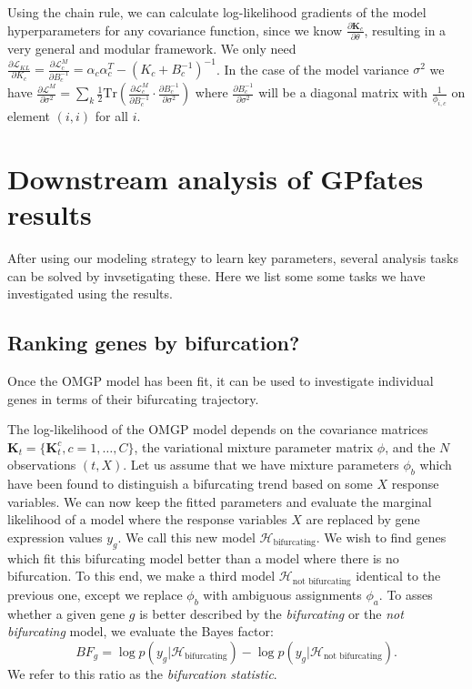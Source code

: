 Using the chain rule, we can calculate log-likelihood gradients of the model hyperparameters for any covariance function, since we know $ \frac{\partial \bm{K}_c}{\partial \mathbb{\theta}} $, resulting in a very general and modular framework. We only need
$ \frac{\partial \mathcal{L}_{KL}}{\partial K_c} =
\frac{\partial \mathcal{L}^{M}_c}{\partial B_c^{-1}} =
\alpha_c \alpha_c^T  - (K_c + B_c^{-1})^{-1} $.
In the case of the model variance $ \sigma^2 $ we have
$ \frac{\partial \mathcal{L}^{M}}{\partial \sigma^2} =
\sum_k \frac{1}{2} \text{Tr} \left( \frac{\partial \mathcal{L}^{M}_c}{\partial B_c^{-1}} \cdot
\frac{\partial B_c^{-1}}{\partial \sigma^2} \right) $
where $ \frac{\partial B_c^{-1}}{\partial \sigma^2} $ will be a diagonal matrix with
$ \frac{1}{\phi_{i, c}} $ on element $ (i, i) $ for all $ i $.

\section{Downstream analysis of GPfates results}

After using our modeling strategy to learn key parameters, several analysis tasks can be solved by invsetigating these. Here we list some some tasks we have investigated using the results.

\subsection{Ranking genes by bifurcation?}

Once the OMGP model has been fit, it can be used to investigate individual genes in terms of their bifurcating trajectory.

The log-likelihood of the OMGP model depends on the covariance matrices $ \mathbf{K}_t = \{ \bm{K}^c_t, c=1, \ldots, C\} $, the variational mixture parameter matrix $ \phi $, and the $ N $ observations $ (t, X) $. Let us assume that we have mixture parameters $ \phi_{b} $ which have been found to distinguish a bifurcating trend based on some $ X $ response variables. We can now keep the fitted parameters and evaluate the marginal likelihood of a model where the response variables $ X $ are replaced by gene expression values $ y_g $. We call this new model $ \mathcal{H}_\text{bifurcating} $. We wish to find genes which fit this bifurcating model better than a model where there is no bifurcation. To this end, we make a third model $ \mathcal{H}_\text{not bifurcating} $ identical to the previous one, except we replace $ \phi_{b} $ with ambiguous assignments $ \phi_a $. To asses whether a given gene $ g $ is better described by the \textit{bifurcating} or the \textit{not bifurcating} model, we evaluate the Bayes factor:
$$
BF_{g} = \log p(y_g | \mathcal{H}_\text{bifurcating}) - \log p(y_g | \mathcal{H}_\text{not bifurcating}).
$$
We refer to this ratio as the \textit{bifurcation statistic}.

